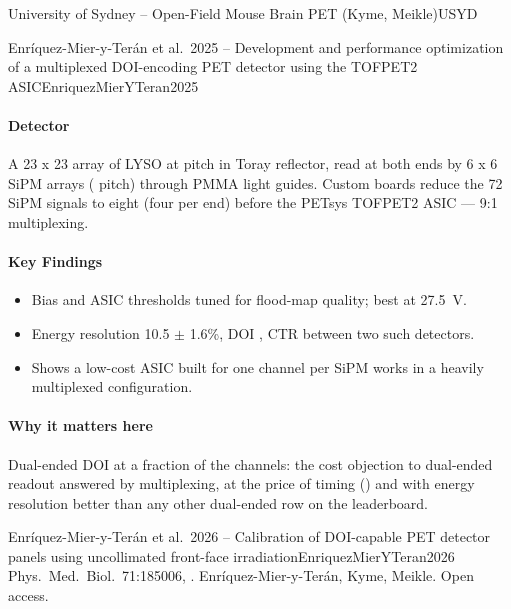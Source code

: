 \begin{programnote}{University of Sydney -- Open-Field Mouse Brain PET (Kyme, Meikle)}{USYD}
\begin{papernote}{Enríquez-Mier-y-Terán et al.\ 2025 -- Development and performance optimization of a multiplexed DOI-encoding PET detector using the TOFPET2 ASIC}{EnriquezMierYTeran2025}
\paragraph{Detector}
A 23 x 23 array of  LYSO at  pitch
in Toray reflector, read at both ends by 6 x 6 SiPM arrays ( pitch)
through  PMMA light guides. Custom boards reduce the 72 SiPM signals to
eight (four per end) before the PETsys TOFPET2 ASIC --- 9:1 multiplexing.

\paragraph{Key Findings}
\begin{itemize}
	\item Bias and ASIC thresholds tuned for flood-map quality; best at
		\qty{27.5}{\volt}.
	\item Energy resolution 10.5 $\pm$ 1.6\%, DOI , CTR
		 between two such detectors.
	\item Shows a low-cost ASIC built for one channel per SiPM works in a
		heavily multiplexed configuration.
\end{itemize}

\paragraph{Why it matters here}
Dual-ended DOI at a fraction of the channels: the cost objection to dual-ended
readout answered by multiplexing, at the price of timing () and with
energy resolution better than any other dual-ended row on the leaderboard.
\end{papernote}

\begin{papernote}{Enríquez-Mier-y-Terán et al.\ 2026 -- Calibration of DOI-capable PET detector panels using uncollimated front-face irradiation}{EnriquezMierYTeran2026}
Phys.\ Med.\ Biol.\ 71:185006, .
Enríquez-Mier-y-Terán, Kyme, Meikle. Open access.


\end{papernote}
\end{programnote}
